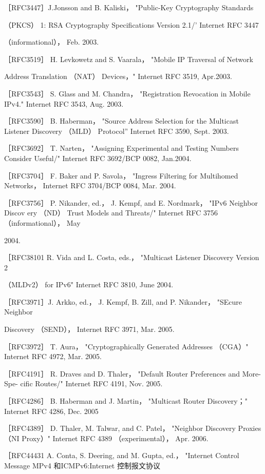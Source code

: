 ［RFC3447］J.Jonsson and B. Kaliski， "Public-Key Cryptography Standards

（PKCS） 1: RSA Cryptography Specifications Version 2.1/' Internet RFC 3447

（informational）， Feb. 2003.

［RFC3519］ H. Levkowetz and S. Vaarala， "Mobile IP Traversal of Network

Address Translation （NAT） Devices，" Internet RFC 3519, Apr.2003.

［RFC3543］ S. Glass and M. Chandra， "Registration Revocation in Mobile IPv4."
Internet RFC 3543, Aug. 2003.

［RFC3590］ B. Haberman， "Source Address Selection for the Multicast Listener
Discovery （MLD） Protocol” Internet RFC 3590, Sept. 2003.

［RFC3692］ T. Narten， "Assigning Experimental and Testing Numbers Consider
Useful/" Internet RFC 3692/BCP 0082, Jan.2004.

［RFC3704］ F. Baker and P. Savola， "Ingress Filtering for Multihomed Networks，
Internet RFC 3704/BCP 0084, Mar. 2004.

［RFC3756］ P. Nikander, ed.， J. Kempf, and E. Nordmark， "IPv6 Neighbor Discov
ery （ND） Trust Models and Threats/" Internet RFC 3756 （informational）， May

2004.

［RFC38101 R. Vida and L. Costa, eds.， "Multicast Listener Discovery Version 2

（MLDv2） for IPv6" Internet RFC 3810, June 2004.

［RFC3971］J. Arkko, ed.， J. Kempf, B. Zill, and P. Nikander， "SEcure Neighbor

Discovery （SEND）， Internet RFC 3971, Mar. 2005.

［RFC3972］ T. Aura， "Cryptographically Generated Addresses （CGA）" Internet
RFC 4972, Mar. 2005.

［RFC4191］ R. Draves and D. Thaler， "Default Router Preferences and More-Spe-
cific Routes/" Internet RFC 4191, Nov. 2005.

［RFC4286］ B. Haberman and J. Martin， "Multicast Router Discovery；" Internet
RFC 4286, Dec. 2005

［RFC4389］ D. Thaler, M. Talwar, and C. Patel， "Neighbor Discovery Proxies （NI
Proxy）" Internet RFC 4389 （experimental）， Apr. 2006.

［RFC44431 A. Conta, S. Deering, and M. Gupta, ed.， "Internet Control Message
MPv4 和ICMPv6:Internet 控制报文协议

